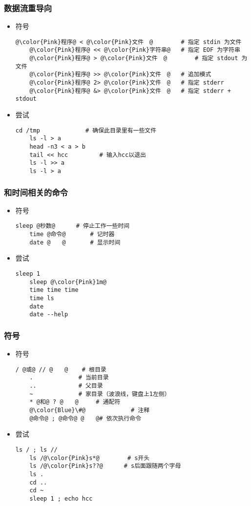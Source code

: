 \begin{CJK}{UTF8}{gbsn}
\begin{frame} [fragile]
	\frametitle{数据流重导向}
	\begin{itemize}
	\item 符号
	\begin{lstlisting}[style=bashstyle, gobble=4, texcl, escapechar=@]
	@\color{Pink}程序@ < @\color{Pink}文件　@		# 指定 stdin 为文件
	@\color{Pink}程序@ << @\color{Pink}字符串@	# 指定 EOF 为字符串
	@\color{Pink}程序@ > @\color{Pink}文件　@		# 指定 stdout 为文件
	@\color{Pink}程序@ >> @\color{Pink}文件　@	# 追加模式
	@\color{Pink}程序@ 2> @\color{Pink}文件　@	# 指定 stderr
	@\color{Pink}程序@ &> @\color{Pink}文件　@	# 指定 stderr + stdout
	\end{lstlisting}
	\item 尝试
	\begin{lstlisting}[style=bashstyle, gobble=4, texcl]
	cd /tmp				# 确保此目录里有一些文件
	ls -l > a
	head -n3 < a > b
	tail << hcc			# 输入hcc以退出
	ls -l >> a
	ls -l > a
	\end{lstlisting}
	\end{itemize}
\end{frame}

\begin{frame} [fragile]
	\frametitle{和时间相关的命令}
	\linespread{1.25}
	\begin{itemize}
	\item 符号
	\begin{lstlisting}[style=bashstyle, gobble=4, texcl, escapechar=@]
	sleep @秒数@		# 停止工作一些时间
	time @命令@		# 记时器
	date @　　@		# 显示时间
	\end{lstlisting}
	\item 尝试
	\begin{lstlisting}[style=bashstyle, gobble=4, texcl, escapechar=@]
	sleep 1
	sleep @\color{Pink}1m@
	time time time
	time ls
	date
	date --help
	\end{lstlisting}
	\end{itemize}
\end{frame}

\begin{frame} [fragile]
	\frametitle{符号}
	\begin{itemize}
	\item 符号
	\begin{lstlisting}[style=bashstyle, gobble=4, texcl, escapechar=@]
	/ @或@ // @　　@	 # 根目录
	.			  # 当前目录
	..			  # 父目录
	~			  # 家目录（波浪线，键盘上1左侧）
	* @和@ ? @　　@	 # 通配符
	@\color{Blue}\#@			 # 注释
	@命令@ ; @命令@ @　　@# 依次执行命令
	\end{lstlisting}
	\item 尝试
	\begin{lstlisting}[style=bashstyle, gobble=4, texcl, escapechar=@]
	ls / ; ls //
	ls /@\color{Pink}s*@		# s开头
	ls /@\color{Pink}s??@	   # s后面跟随两个字母
	ls .
	cd ..
	cd ~
	sleep 1 ; echo hcc
	\end{lstlisting}
	\end{itemize}
\end{frame}


\end{CJK}
